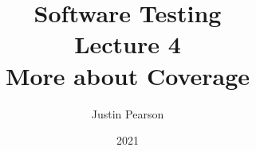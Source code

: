 \documentclass[handout]{beamer}
\title{Software Testing\\ Lecture 4\\ More about Coverage}
\author{Justin Pearson}
\date{2021}
\begin{document}
\lstset{language=C}

\begin{frame}
  \maketitle
\end{frame}

%
\end{document}
